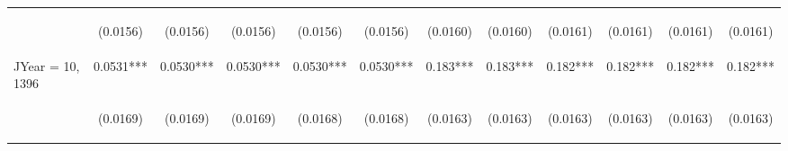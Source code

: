 \documentclass[]{article}
\begin{document}
\begin{center}
\begin{tabular}{lccccccccccc}
\vspace{4pt} & \begin{footnotesize}(0.0156)\end{footnotesize} & \begin{footnotesize}(0.0156)\end{footnotesize} & \begin{footnotesize}(0.0156)\end{footnotesize} & \begin{footnotesize}(0.0156)\end{footnotesize} & \begin{footnotesize}(0.0156)\end{footnotesize} & \begin{footnotesize}(0.0160)\end{footnotesize} & \begin{footnotesize}(0.0160)\end{footnotesize} & \begin{footnotesize}(0.0161)\end{footnotesize} & \begin{footnotesize}(0.0161)\end{footnotesize} & \begin{footnotesize}(0.0161)\end{footnotesize} & \begin{footnotesize}(0.0161)\end{footnotesize} \\
JYear = 10, 1396 & 0.0531*** & 0.0530*** & 0.0530*** & 0.0530*** & 0.0530*** & 0.183*** & 0.183*** & 0.182*** & 0.182*** & 0.182*** & 0.182*** \\
\vspace{4pt} & \begin{footnotesize}(0.0169)\end{footnotesize} & \begin{footnotesize}(0.0169)\end{footnotesize} & \begin{footnotesize}(0.0169)\end{footnotesize} & \begin{footnotesize}(0.0168)\end{footnotesize} & \begin{footnotesize}(0.0168)\end{footnotesize} & \begin{footnotesize}(0.0163)\end{footnotesize} & \begin{footnotesize}(0.0163)\end{footnotesize} & \begin{footnotesize}(0.0163)\end{footnotesize} & \begin{footnotesize}(0.0163)\end{footnotesize} & \begin{footnotesize}(0.0163)\end{footnotesize} & \begin{footnotesize}(0.0163)\end{footnotesize} \\

\end{tabular}
\end{center}
\end{document}
